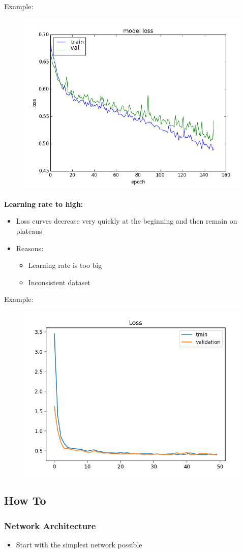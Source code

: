 \documentclass[10pt,a4paper]{article}
\begin{document}
Example:
\begin{figure}[H]
	\includegraphics[width=0.5\columnwidth]{figures/graph_lr_low.png}
\end{figure}

\textbf{Learning rate to high:}
\begin{itemize}
	\item Loss curves decrease very quickly at the beginning and then remain on plateaus
	\item Reasons:
	\begin{itemize}
		\item Learning rate is too big
		\item Inconsistent dataset
	\end{itemize}
\end{itemize}

Example:
\begin{figure}[H]
	\includegraphics[width=0.5\columnwidth]{figures/graph_lr_high.png}
\end{figure}

\subsection{How To}
\subsubsection{Network Architecture}
\begin{itemize}
	\item Start with the simplest network possible
\end{itemize}
\end{document}
